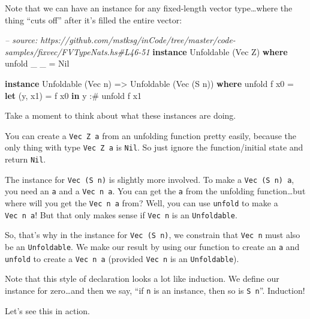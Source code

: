 \documentclass[]{article}
\newenvironment{Shaded}{}{}
\newcommand{\KeywordTok}[1]{\textcolor[rgb]{0.00,0.44,0.13}{\textbf{{#1}}}}
\newcommand{\DataTypeTok}[1]{\textcolor[rgb]{0.56,0.13,0.00}{{#1}}}
\newcommand{\CommentTok}[1]{\textcolor[rgb]{0.38,0.63,0.69}{\textit{{#1}}}}
\newcommand{\OtherTok}[1]{\textcolor[rgb]{0.00,0.44,0.13}{{#1}}}
\newcommand{\FunctionTok}[1]{\textcolor[rgb]{0.02,0.16,0.49}{{#1}}}
\newcommand{\NormalTok}[1]{{#1}}
\begin{document}
Note that we can have an instance for any fixed-length vector type\ldots{}where
the thing ``cuts off'' after it's filled the entire vector:

\begin{Shaded}
\begin{Highlighting}[]
\CommentTok{-- source: https://github.com/mstksg/inCode/tree/master/code-samples/fixvec/FVTypeNats.hs#L46-51}
\KeywordTok{instance} \DataTypeTok{Unfoldable} \NormalTok{(}\DataTypeTok{Vec} \DataTypeTok{Z}\NormalTok{) }\KeywordTok{where}
    \NormalTok{unfold _ _ }\FunctionTok{=} \DataTypeTok{Nil}

\KeywordTok{instance} \DataTypeTok{Unfoldable} \NormalTok{(}\DataTypeTok{Vec} \NormalTok{n) }\OtherTok{=>} \DataTypeTok{Unfoldable} \NormalTok{(}\DataTypeTok{Vec} \NormalTok{(}\DataTypeTok{S} \NormalTok{n)) }\KeywordTok{where}
    \NormalTok{unfold f x0 }\FunctionTok{=} \KeywordTok{let} \NormalTok{(y, x1) }\FunctionTok{=} \NormalTok{f x0}
                  \KeywordTok{in}  \NormalTok{y }\FunctionTok{:#} \NormalTok{unfold f x1}
\end{Highlighting}
\end{Shaded}

Take a moment to think about what these instances are doing.

You can create a \texttt{Vec\ Z\ a} from an unfolding function pretty easily,
because the only thing with type \texttt{Vec\ Z\ a} is \texttt{Nil}. So just
ignore the function/initial state and return \texttt{Nil}.

The instance for \texttt{Vec\ (S\ n)} is slightly more involved. To make a
\texttt{Vec\ (S\ n)\ a}, you need an \texttt{a} and a \texttt{Vec\ n\ a}. You
can get the \texttt{a} from the unfolding function\ldots{}but where will you get
the \texttt{Vec\ n\ a} from? Well, you can use \texttt{unfold} to make a
\texttt{Vec\ n\ a}! But that only makes sense if \texttt{Vec\ n} is an
\texttt{Unfoldable}.

So, that's why in the instance for \texttt{Vec\ (S\ n)}, we constrain that
\texttt{Vec\ n} must also be an \texttt{Unfoldable}. We make our result by using
our function to create an \texttt{a} and \texttt{unfold} to create a
\texttt{Vec\ n\ a} (provided \texttt{Vec\ n} is an \texttt{Unfoldable}).

Note that this style of declaration looks a lot like induction. We define our
instance for zero\ldots{}and then we say, ``if \texttt{n} is an instance, then
so is \texttt{S\ n}''. Induction!

Let's see this in action.
\end{document}
